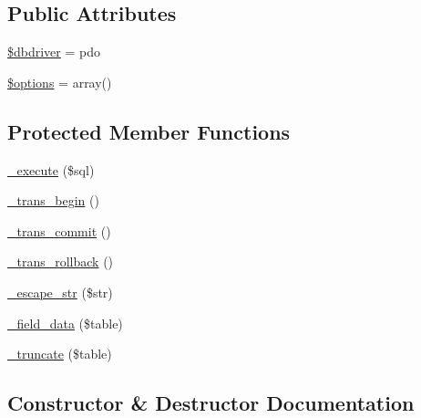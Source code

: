 \subsection*{Public Attributes}
\begin{DoxyCompactItemize}
\item 
\mbox{\hyperlink{class_c_i___d_b__pdo__driver_a0cde2a16322a023d040aa7f725877597}{\$dbdriver}} = \textquotesingle{}pdo\textquotesingle{}
\item 
\mbox{\hyperlink{class_c_i___d_b__pdo__driver_a011800c63ece4cbbfa77136a20607023}{\$options}} = array()
\end{DoxyCompactItemize}
\subsection*{Protected Member Functions}
\begin{DoxyCompactItemize}
\item 
\mbox{\hyperlink{class_c_i___d_b__pdo__driver_a114ab675d89bf8324a41785fb475e86d}{\+\_\+execute}} (\$sql)
\item 
\mbox{\hyperlink{class_c_i___d_b__pdo__driver_ac81ac882c1d54347d810199a15856aac}{\+\_\+trans\+\_\+begin}} ()
\item 
\mbox{\hyperlink{class_c_i___d_b__pdo__driver_a6fe7f373e0b11cfae23a5f41c0b35dda}{\+\_\+trans\+\_\+commit}} ()
\item 
\mbox{\hyperlink{class_c_i___d_b__pdo__driver_ad49a116b0776c26b53114c9093fd102a}{\+\_\+trans\+\_\+rollback}} ()
\item 
\mbox{\hyperlink{class_c_i___d_b__pdo__driver_af8ef0237bfcdb19215b63fff769e7a55}{\+\_\+escape\+\_\+str}} (\$str)
\item 
\mbox{\hyperlink{class_c_i___d_b__pdo__driver_a95247d9671893adc3444cb184ad32ea1}{\+\_\+field\+\_\+data}} (\$table)
\item 
\mbox{\hyperlink{class_c_i___d_b__pdo__driver_aa029600528fc1ce660a23ff4b4667f95}{\+\_\+truncate}} (\$table)
\end{DoxyCompactItemize}


\subsection{Constructor \& Destructor Documentation}
\mbox{\label{class_c_i___d_b__pdo__driver_a9162320adff1a1a4afd7f2372f753a3e}} 
